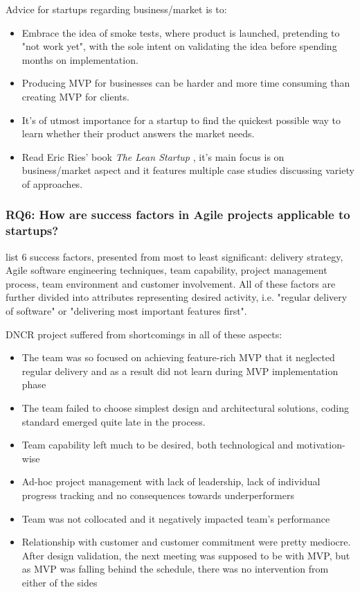 \documentclass{article}
\begin{document}
Advice for startups regarding business/market is to:
\begin{itemize}
\item Embrace the idea of smoke tests, where product is launched, pretending to "not work yet", with the sole intent on validating the idea before spending months on implementation.
\item Producing MVP for businesses can be harder and more time consuming than creating MVP for clients.
\item It's of utmost importance for a startup to find the quickest possible way to learn whether their product answers the market needs.
\item Read Eric Ries' book \textit{The Lean Startup} \citep{ries2011lean}, it's main focus is on business/market aspect and it features multiple case studies discussing variety of approaches.
\end{itemize}

\subsubsection{RQ6: How are success factors in Agile projects \citep{cao2008agile} applicable to startups?}
\citeauthor{cao2008agile} list 6 success factors, presented from most to least significant: delivery strategy, Agile software engineering techniques, team capability, project management process, team environment and customer involvement. All of these factors are further divided into attributes representing desired activity, i.e. "regular delivery of software" or "delivering most important features first".

DNCR project suffered from shortcomings in all of these aspects:
\begin{itemize}
\item The team was so focused on achieving feature-rich MVP that it neglected regular delivery and as a result did not learn during MVP implementation phase
\item The team failed to choose simplest design and architectural solutions, coding standard emerged quite late in the process.
\item Team capability left much to be desired, both technological and motivation-wise
\item Ad-hoc project management with lack of leadership, lack of individual progress tracking and no consequences towards underperformers
\item Team was not collocated and it negatively impacted team's performance
\item Relationship with customer and customer commitment were pretty mediocre. After design validation, the next meeting was supposed to be with MVP, but as MVP was falling behind the schedule, there was no intervention from either of the sides
\end{itemize}
\end{document}
